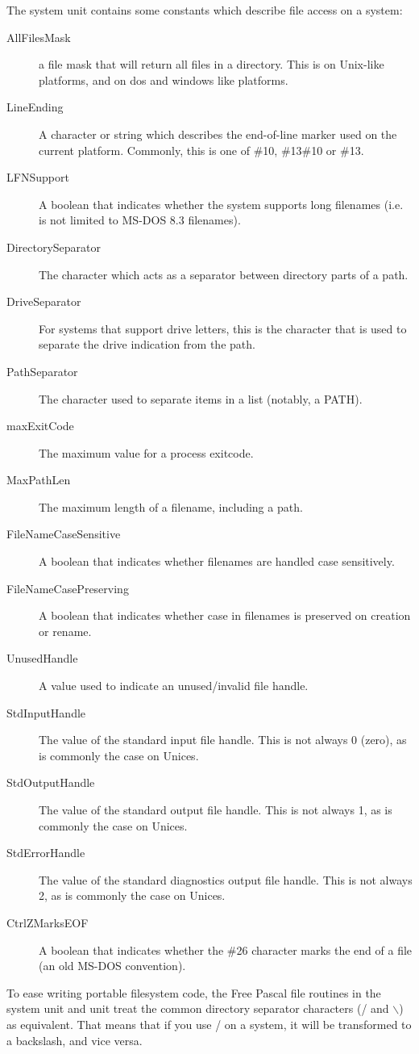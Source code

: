 The system unit contains some constants which describe file access on a system:
\begin{description}
\item[AllFilesMask] a file mask that will return all files in a directory.
This is \var{*} on Unix-like platforms, and  on dos and windows
like platforms.
\item[LineEnding] A character or string which describes the end-of-line marker 
used on the current platform. Commonly, this is one of \#10, \#13\#10 or \#13.
\item[LFNSupport] A boolean that indicates whether the system supports long filenames
(i.e. is not limited to MS-DOS 8.3 filenames).
\item[DirectorySeparator] The character which acts as a separator between directory parts of a path.
\item[DriveSeparator] For systems that support drive letters, this is the character that
is used to separate the drive indication from the path.
\item[PathSeparator] The character used to separate items in a list (notably, a PATH).
\item[maxExitCode] The maximum value for a process exitcode.
\item[MaxPathLen] The maximum length of a filename, including a path.
\item[FileNameCaseSensitive] A boolean that indicates whether filenames are handled case sensitively.
\item[FileNameCasePreserving] A boolean that indicates whether case in filenames is preserved on creation or rename.
\item[UnusedHandle] A value used to indicate an unused/invalid file handle.
\item[StdInputHandle] The value of the standard input file handle. 
This is not always 0 (zero), as is commonly the case on Unices.
\item[StdOutputHandle] The value of the standard output file handle. 
This is not always 1, as is commonly the case on Unices.
\item[StdErrorHandle] The value of the standard diagnostics output file handle. 
This is not always 2, as is commonly the case on Unices.
\item[CtrlZMarksEOF] A boolean that indicates whether the \#26 character marks the end of a file
(an old MS-DOS convention).
\end{description}

To ease writing portable filesystem code, the Free Pascal file routines in
the system unit and  unit treat the common directory separator 
characters (/ and $\backslash$) as equivalent. That means that if you use / on a \windows 
system, it will be transformed to a backslash, and vice versa. 

